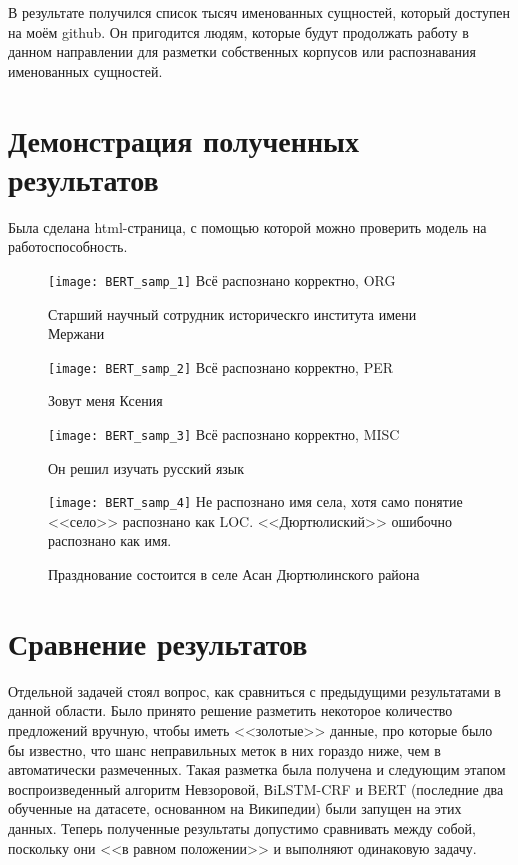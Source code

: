 В результате получился список тысяч именованных сущностей, который доступен на моём github. Он пригодится людям, которые будут продолжать работу в данном направлении для разметки собственных корпусов или распознавания именованных сущностей. 

\section{Демонстрация полученных результатов}

Была сделана html-страница, с помощью которой можно проверить модель на работоспособность.

\begin{figure}[H]
\caption{Старший научный сотрудник историческго института имени Мержани}
\texttt{[image: BERT\_samp\_1]}
Всё распознано корректно, ORG
\label{fig:BERT_samp_1}
\end{figure}
\begin{figure}[H]
\caption{Зовут меня Ксения}
\texttt{[image: BERT\_samp\_2]}
Всё распознано корректно, PER
\label{fig:BERT_samp_2}
\end{figure}
\begin{figure}[H]
\caption{Он решил изучать русский язык}
\texttt{[image: BERT\_samp\_3]}
Всё распознано корректно, MISC
\label{fig:BERT_samp_3}
\end{figure}
\begin{figure}[H]
\caption{Празднование состоится в селе Асан Дюртюлинского района}
\texttt{[image: BERT\_samp\_4]}
Не распознано имя села, хотя само понятие <<село>> распознано как LOC. <<Дюртюлиский>> ошибочно распознано как имя.
\label{fig:BERT_samp_4}
\end{figure}



\section{Сравнение результатов}

Отдельной задачей стоял вопрос, как сравниться с предыдущими результатами в данной области. Было принято решение разметить некоторое количество предложений вручную, чтобы иметь <<золотые>> данные, про которые было бы известно, что шанс неправильных меток в них гораздо ниже, чем в автоматически размеченных. Такая разметка была получена и следующим этапом воспроизведенный алгоритм Невзоровой, ВiLSTM-CRF и BERT (последние два обученные на датасете, основанном на Википедии) были запущен на этих данных. Теперь полученные результаты допустимо сравнивать между собой, поскольку они <<в равном положении>> и выполняют одинаковую задачу.

